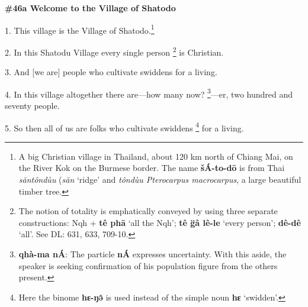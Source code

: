 
\textbf{\#46a Welcome to the Village of Shatodo}

1. This village is the Village of Shatodo.\footnote{A big Christian village in Thailand, about 120 km north of Chiang Mai, on the River Kok on the Burmese border. The name \textbf{šÁ-to-dō}  is from Thai \textit{săntôndùu} (\textit{săn} `ridge' and \textit{tôndùu Pterocarpus macrocarpus}, a large beautiful timber tree.}

2. In this Shatodu Village every single person \footnote{The notion of totality is emphatically conveyed by using three separate constructions: Nqh + \textbf{tê phā} `all the Nqh';\textbf{ tê g̈â lê-le} `every person'; \textbf{dê-dê }`all'. See DL: 631, 633, 709-10.} is Christian.

3. And [we are] people who cultivate swiddens for a living.

4. In this village altogether there are---how many now? \footnote{\textbf{qhà-ma nÁ}: The particle \textbf{nÁ} expresses uncertainty. With this aside, the speaker is seeking confirmation of his population figure from the others present.}---er, two hundred and
seventy people.

5. So then all of us are folks who cultivate swiddens \footnote{Here the binome \textbf{hɛ-ŋə̂} is used instead of the simple noun \textbf{hɛ} `swidden'.} for a living.

